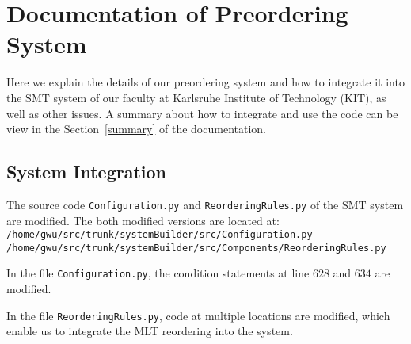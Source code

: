 

\appendix

{}	%
{}	%




%		
%		
%
%


\section{Documentation of Preordering System}
		\label{Documentation}

Here we explain the details of our preordering system and how to integrate it into the SMT system of our faculty at Karlsruhe Institute of Technology (KIT), as well as other issues. A summary about how to integrate and use the code can be view in the Section~\ref{summary} of the documentation.

\subsection{System Integration}

The source code \verb|Configuration.py| and \verb|ReorderingRules.py| of the SMT system are modified. The both modified versions are located at:\\
\verb|/home/gwu/src/trunk/systemBuilder/src/Configuration.py|\\
\verb|/home/gwu/src/trunk/systemBuilder/src/Components/ReorderingRules.py|

In the file \verb|Configuration.py|, the condition statements at line $628$ and $634$ are modified.

In the file \verb|ReorderingRules.py|, code at multiple locations are modified, which enable us to integrate the MLT reordering into the system.

